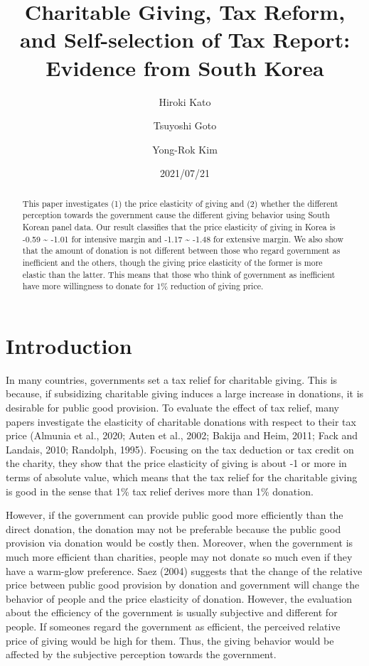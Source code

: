 \documentclass[
]{article}
\title{Charitable Giving, Tax Reform, and Self-selection of Tax Report: Evidence from South Korea}
\author[]{Hiroki Kato}
\affil{Osaka University}
\author[]{Tsuyoshi Goto}
\affil{Chiba University}
\author[]{Yong-Rok Kim}
\affil{Kobe University}
\date{2021/07/21}
\begin{document}
\maketitle
\begin{abstract}
This paper investigates (1) the price elasticity of giving and (2) whether the different perception towards the government cause the different giving behavior using South Korean panel data. Our result classifies that the price elasticity of giving in Korea is -0.59 \textasciitilde{} -1.01 for intensive margin and -1.17 \textasciitilde{} -1.48 for extensive margin. We also show that the amount of donation is not different between those who regard government as inefficient and the others, though the giving price elasticity of the former is more elastic than the latter. This means that those who think of government as inefficient have more willingness to donate for 1\% reduction of giving price.
\end{abstract}

\hypertarget{introduction}{%
\section{Introduction}\label{introduction}}

In many countries, governments set a tax relief for charitable giving. This is because, if subsidizing charitable giving induces a large increase in donations, it is desirable for public good provision. To evaluate the effect of tax relief, many papers investigate the elasticity of charitable donations with respect to their tax price (Almunia et al., 2020; Auten et al., 2002; Bakija and Heim, 2011; Fack and Landais, 2010; Randolph, 1995). Focusing on the tax deduction or tax credit on the charity, they show that the price elasticity of giving is about -1 or more in terms of absolute value, which means that the tax relief for the charitable giving is good in the sense that 1\% tax relief derives more than 1\% donation.

However, if the government can provide public good more efficiently than the direct donation, the donation may not be preferable because the public good provision via donation would be costly then.
Moreover, when the government is much more efficient than charities, people may not donate so much even if they have a warm-glow preference. Saez (2004) suggests that the change of the relative price between public good provision by donation and government will change the behavior of people and the price elasticity of donation.
However, the evaluation about the efficiency of the government is usually subjective and different for people. If someones regard the government as efficient, the perceived relative price of giving would be high for them. Thus, the giving behavior would be affected by the subjective perception towards the government.
\end{document}
